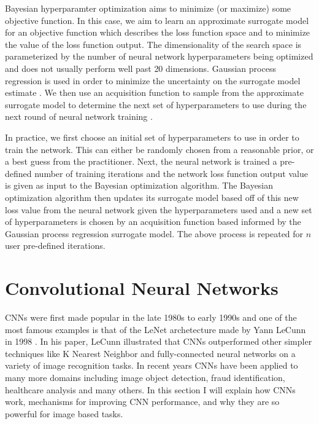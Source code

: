 Bayesian hyperparamter optimization aims to minimize (or maximize) some 
objective function. In this case, we aim to learn an 
approximate surrogate model for an objective function which 
describes the loss function space and to minimize the value of the 
loss function output. The dimensionality of the search space 
is parameterized by the number of neural network hyperparameters being optimized 
and does not usually perform well past 20 dimensions. Gaussian process 
regression is used in order to minimize the uncertainty on the surrogate model estimate 
. We then use an acquisition function to sample from the approximate 
surrogate model to determine the next set of hyperparameters to use 
during the next round of neural network training \cite{1807.02811}.

In practice, we first choose an initial set of hyperparameters 
to use in order to train the network. This can either be randomly chosen 
from a reasonable prior, or a best guess from the practitioner. 
Next, the neural network is trained a pre-defined number of 
training iterations and the network loss function output value 
is given as input to the Bayesian optimization algorithm. The Bayesian 
optimization algorithm then updates its surrogate model 
based off of this new loss value from the neural network 
given the hyperparameters used and a new set of 
hyperparameters is chosen by an acquisition function based 
informed by the Gaussian process regression surrogate model. 
The above process is repeated for $n$ user pre-defined iterations.
%

\section{Convolutional Neural Networks}

\ac{CNN}s were first made popular in the late 1980s to early 1990s 
and one of the most famous examples is that of the LeNet archetecture 
made by Yann LeCunn in 1998 \cite{726791}. In his paper, LeCunn 
illustrated that \ac{CNN}s outperformed other simpler 
techniques like K Nearest Neighbor and fully-connected 
neural networks on a variety of image recognition 
tasks. In recent years \ac{CNN}s have been applied to 
many more domains including image object detection, 
fraud identification, healthcare analysis and many 
others. In this section I will explain how \ac{CNN}s work, 
mechanisms for improving \ac{CNN} performance, and 
why they are so powerful for image based tasks.

